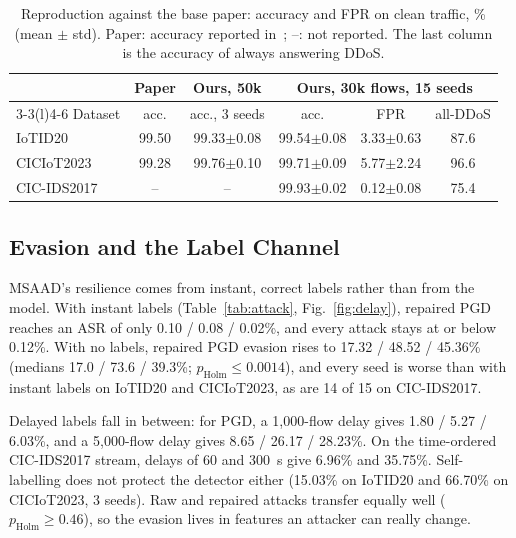 \documentclass[conference]{IEEEtran}
\begin{document}
\begin{table}[t]
\caption{Reproduction against the base paper: accuracy and FPR on clean traffic, \% (mean $\pm$ std). Paper: accuracy reported in~\cite{beshah2025msaad}; --: not reported. The last column is the accuracy of always answering DDoS.}
\label{tab:repro}
\centering
\footnotesize
\setlength{\tabcolsep}{2.5pt}
\begin{tabular}{@{}lccccc@{}}
\toprule
 & Paper & \multicolumn{1}{c}{Ours, 50k} & \multicolumn{3}{c}{Ours, 30k flows, 15 seeds} \\
\cmidrule(lr){3-3}\cmidrule(l){4-6}
Dataset & acc. & acc., 3 seeds & acc. & FPR & all-DDoS \\
\midrule
IoTID20 & 99.50 & 99.33$\pm$0.08 & 99.54$\pm$0.08 & 3.33$\pm$0.63 & 87.6 \\
CICIoT2023 & 99.28 & 99.76$\pm$0.10 & 99.71$\pm$0.09 & 5.77$\pm$2.24 & 96.6 \\
CIC-IDS2017 & -- & -- & 99.93$\pm$0.02 & 0.12$\pm$0.08 & 75.4 \\
\bottomrule
\end{tabular}
\end{table}

\subsection{Evasion and the Label Channel}
MSAAD's resilience comes from instant, correct labels rather than from the
model. With instant labels (Table~\ref{tab:attack}, Fig.~\ref{fig:delay}),
repaired PGD reaches an ASR of only 0.10 / 0.08 / 0.02\%, and every attack stays
at or below 0.12\%. With no labels, repaired PGD evasion rises to 17.32 / 48.52 /
45.36\% (medians 17.0 / 73.6 / 39.3\%; $p_{\text{Holm}} \le 0.0014$), and every
seed is worse than with instant labels on IoTID20 and CICIoT2023, as are 14 of
15 on CIC-IDS2017.

Delayed labels fall in between: for PGD, a 1{,}000-flow delay gives 1.80 / 5.27 /
6.03\%, and a 5{,}000-flow delay gives 8.65 / 26.17 / 28.23\%. On the
time-ordered CIC-IDS2017 stream, delays of 60 and 300~s give 6.96\% and
35.75\%. Self-labelling does not protect the detector either (15.03\% on
IoTID20 and 66.70\% on CICIoT2023, 3 seeds). Raw and repaired attacks transfer
equally well ($p_{\text{Holm}} \ge 0.46$), so the evasion lives in features an
attacker can really change.
\end{document}
